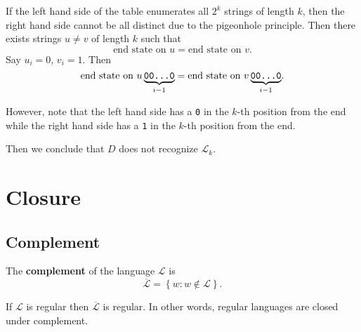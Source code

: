 \documentclass{notes}
\begin{document}
\begin{prf}
\begin{oldenumerate}[topsep = 0ex, label = {(\alph*)}]
    If the left hand side of the table enumerates all $2^k$ strings of length $k$, then the right hand side cannot be all distinct due to the pigeonhole principle.
    Then there exists strings $u \neq v$ of length $k$ such that 
    \[
      \text{end state on $u$} = \text{end state on $v$}.
    \]
    Say $u_i = 0$, $v_i = 1$.
    Then 
    \[
      \text{end state on $u \underbrace{\verb~00...0~}_{i - 1}$} = \text{end state on $v \underbrace{\verb~00...0~}_{i - 1}$}.
    \]
    
    However, note that the left hand side has a \verb~0~ in the $k$-th position from the end while the right hand side has a \verb~1~ in the $k$-th position from the end.

    Then we conclude that $D$ does not recognize $\mathcal L_k$.
  \end{oldenumerate}
\end{prf}

\section{Closure}

\subsection{Complement}

\begin{center}
\end{center}

\begin{defn}
  The {\boldmath \bfseries complement}  of the language $\mathcal L$ is 
  \[
    \overline{\mathcal L} = \left \{ w : w \not \in \mathcal L \right \}.
  \]
\end{defn}

\begin{thm}
  If $\mathcal L$ is regular then $\overline{\mathcal L}$ is regular.
  In other words, regular languages are closed under complement.
\end{thm}
\end{document}
